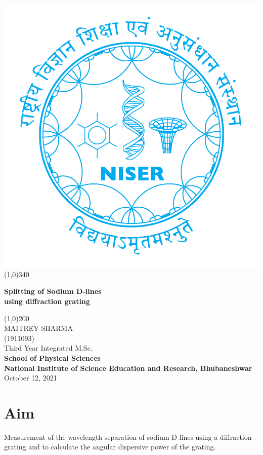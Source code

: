 \documentclass{article}
\begin{document}
\begin{titlepage}
\begin{center}
\includegraphics[scale=0.12]{document/niser.png}
\line(1,0){340}\\
[1mm]
\begin{large}
\textbf{\huge Splitting of Sodium D-lines \\ \normalsize using diffraction grating}\\ 
\end{large}
\line(1,0){200}\\
[5cm]
\large MAITREY SHARMA\\
\small (1911093)\\
[3.5cm]
Third Year Integrated M.Sc.\\
\textbf{School of Physical Sciences}\\
\textbf{National Institute of Science Education and Research, Bhubaneshwar}\\
\small October 12, 2021
\end{center} 
\end{titlepage}
\newpage
\section{Aim}
Measurement of the wavelength separation of sodium D-lines using a diffraction grating and to calculate the angular dispersive power of the grating.
\end{document}
